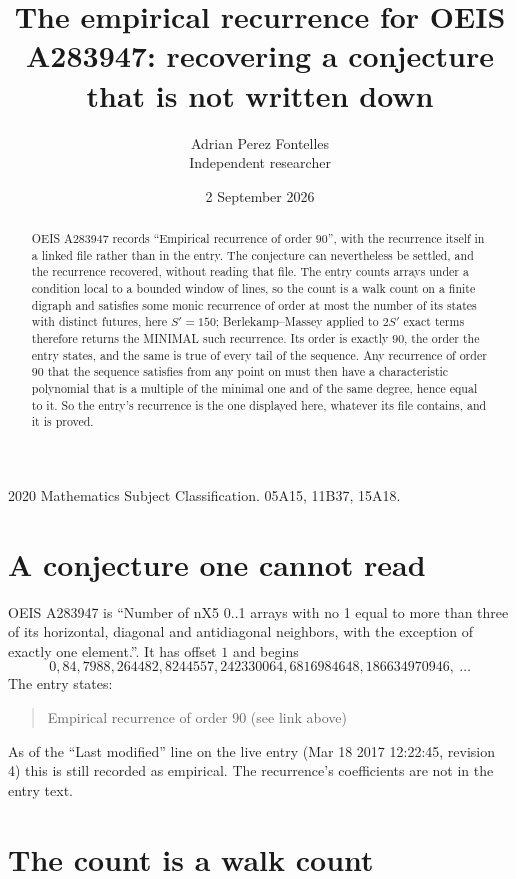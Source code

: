 \documentclass[11pt,a4paper]{article}
\title{The empirical recurrence for OEIS A283947: recovering a conjecture that is not written down}
\author{Adrian Perez Fontelles\\ \small Independent researcher}
\date{2 September 2026}
\theoremstyle{plain}
\theoremstyle{definition}
\begin{document}
\maketitle

\begin{abstract}
OEIS A283947 records ``Empirical recurrence of order $90$'', with the recurrence itself in a
linked file rather than in the entry. The conjecture can nevertheless be settled, and the
recurrence recovered, without reading that file. The entry counts arrays under a condition
local to a bounded window of lines, so the count is a walk count on a finite digraph and
satisfies some monic recurrence of order at most the number of its states with distinct
futures, here $S'=150$; Berlekamp--Massey applied to $2S'$ exact
terms therefore returns the MINIMAL such recurrence. Its order is exactly $90$, the order
the entry states, and the same is true of every tail of the sequence. Any recurrence of order
$90$ that the sequence satisfies from any point on must then have a characteristic
polynomial that is a multiple of the minimal one and of the same degree, hence equal to it. So
the entry's recurrence is the one displayed here, whatever its file contains, and it is
proved.
\end{abstract}

\noindent\small 2020 Mathematics Subject Classification. 05A15, 11B37, 15A18.\normalsize

\section{A conjecture one cannot read}

OEIS A283947 is ``Number of nX5 0..1 arrays with no 1 equal to more than three of its horizontal, diagonal and antidiagonal neighbors, with the exception of exactly one element.''. It has offset $1$ and begins
\[
0, 84, 7988, 264482, 8244557, 242330064, 6816984648, 186634970946,\ \dots
\]
The entry states:
\begin{quote}
Empirical recurrence of order 90 (see link above)
\end{quote}
As of the ``Last modified'' line on the live entry (Mar 18 2017 12:22:45, revision 4) this is still
recorded as empirical. The recurrence's coefficients are not in the entry text.

\section{The count is a walk count}
\end{document}
